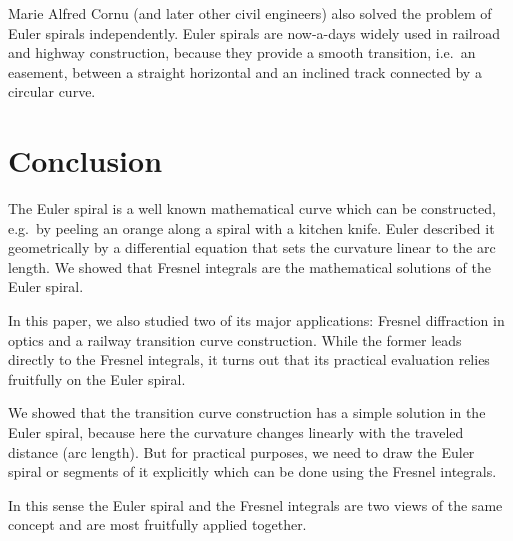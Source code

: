 \documentclass[12pt]{article}
\begin{document}
Marie Alfred Cornu (and later other civil engineers) also solved the problem of Euler spirals independently. Euler spirals are now-a-days widely used in railroad and highway construction, because they provide a smooth transition, i.e.~an easement, between a straight horizontal and an inclined track connected by a circular curve.


\section{Conclusion}
The Euler spiral is a well known mathematical curve which can be constructed, e.g.~by peeling an orange along a spiral with a kitchen knife.  Euler described it geometrically by a differential equation that sets the curvature linear to the arc length.  We showed that Fresnel integrals are the mathematical solutions of the Euler spiral. 

In this paper, we also studied two of its major applications: Fresnel diffraction in optics and a railway transition curve construction.  While the former leads directly to the Fresnel integrals, it turns out that its practical evaluation relies fruitfully on the Euler spiral.

We showed that the transition curve construction has a simple solution in the Euler spiral, because here the curvature changes linearly with the traveled distance (arc length).  But for practical purposes, we need to draw the Euler spiral or segments of it explicitly which can be done using the Fresnel integrals.

In this sense the Euler spiral and the Fresnel integrals are two views of the same concept and are most fruitfully applied together.




\end{document}

